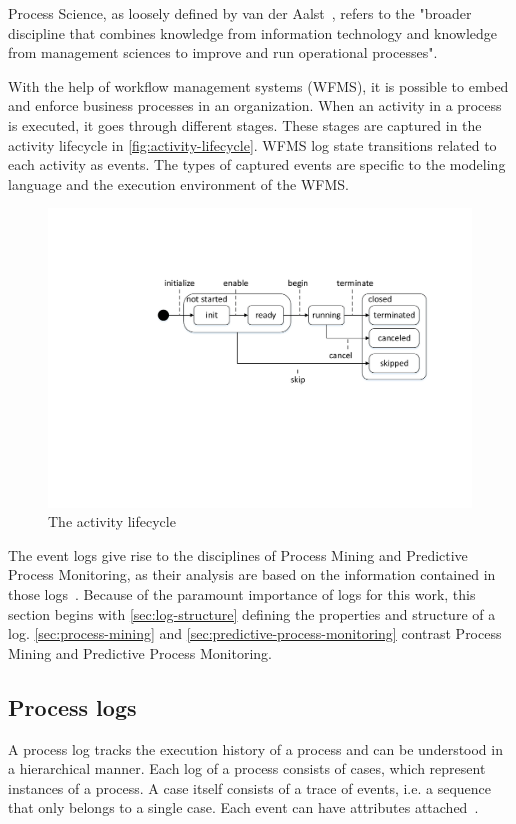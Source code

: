 Process Science, as loosely defined by van der Aalst~\cite{Aalst2016}, refers to the "broader discipline that combines knowledge from information technology and knowledge from management sciences to improve and run operational processes".

With the help of workflow management systems (WFMS), it is possible to embed and enforce business processes in an organization. When an activity in a process is executed, it goes through different stages. These stages are captured in the activity lifecycle in \autoref{fig:activity-lifecycle}. WFMS log state transitions related to each activity as events. The types of captured events are specific to the modeling language and the execution environment of the WFMS.

\begin{figure}[!htb]
    \centering
    \includegraphics[width=.9\textwidth]{gfx/activityLifeCycle.pdf}
    \caption{The activity lifecycle}
    \label{fig:activity-lifecycle}
\end{figure}

The event logs give rise to the disciplines of Process Mining and Predictive Process Monitoring, as their analysis are based on the information contained in those logs~\cite{Aalst2016}. Because of the paramount importance of logs for this work, this section begins with \autoref{sec:log-structure} defining the properties and structure of a log. \autoref{sec:process-mining} and \autoref{sec:predictive-process-monitoring} contrast Process Mining and Predictive Process Monitoring.

\subsection{Process logs}\label{sec:log-structure}
A process log tracks the execution history of a process and can be understood in a hierarchical manner. Each log of a process consists of cases, which represent instances of a process. A case itself consists of a trace of events, i.e. a sequence that only belongs to a single case. Each event can have attributes attached~\cite{Aalst2016}.

